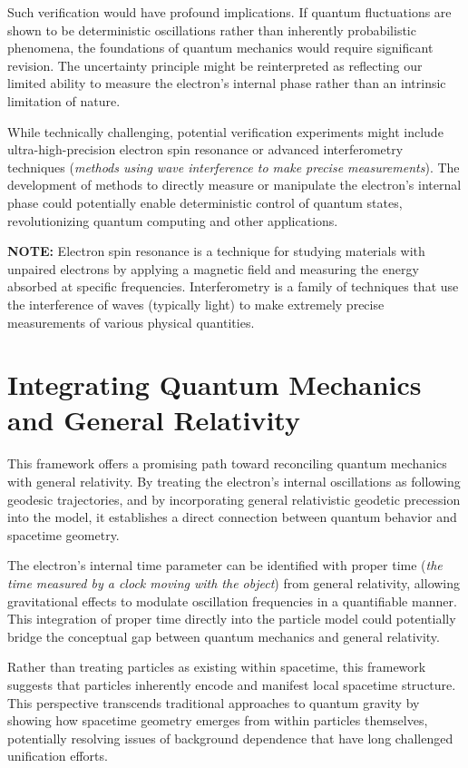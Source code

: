 \documentclass[12pt,letterpaper]{article} %
\begin{document}
Such verification would have profound implications. If quantum fluctuations are shown to be deterministic oscillations rather than inherently probabilistic phenomena, the foundations of quantum mechanics would require significant revision. The uncertainty principle might be reinterpreted as reflecting our limited ability to measure the electron's internal phase rather than an intrinsic limitation of nature.

While technically challenging, potential verification experiments might include ultra-high-precision electron spin resonance\cite{fan2023} or advanced interferometry techniques (\textit{methods using wave interference to make precise measurements}). The development of methods to directly measure or manipulate the electron's internal phase could potentially enable deterministic control of quantum states, revolutionizing quantum computing and other applications.

\vspace{0.5cm}
\noindent\textbf{NOTE:} Electron spin resonance is a technique for studying materials with unpaired electrons by applying a magnetic field and measuring the energy absorbed at specific frequencies. Interferometry is a family of techniques that use the interference of waves (typically light) to make extremely precise measurements of various physical quantities.


\section{Integrating Quantum Mechanics and General Relativity}

This framework offers a promising path toward reconciling quantum mechanics with general relativity\cite{hanamura2025}. By treating the electron's internal oscillations as following geodesic trajectories, and by incorporating general relativistic geodetic precession into the model, it establishes a direct connection between quantum behavior and spacetime geometry.

The electron's internal time parameter can be identified with proper time (\textit{the time measured by a clock moving with the object}) from general relativity, allowing gravitational effects to modulate oscillation frequencies in a quantifiable manner\cite{einstein1912}. This integration of proper time directly into the particle model could potentially bridge the conceptual gap between quantum mechanics and general relativity.

Rather than treating particles as existing within spacetime, this framework suggests that particles inherently encode and manifest local spacetime structure\cite{penrose1971}. This perspective transcends traditional approaches to quantum gravity by showing how spacetime geometry emerges from within particles themselves, potentially resolving issues of background dependence that have long challenged unification efforts.
\end{document}
